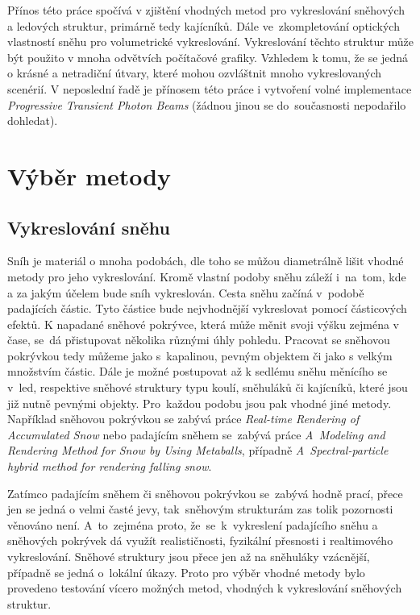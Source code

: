 Přínos této práce spočívá v zjištění vhodných metod pro vykreslování sněhových a ledových struktur, primárně tedy kajícníků. Dále ve~zkompletování optických vlastností sněhu pro volumetrické vykreslování. Vykreslování těchto struktur může být použito v mnoha odvětvích počítačové grafiky. Vzhledem k tomu, že se jedná o krásné a netradiční útvary, které mohou ozvláštnit mnoho vykreslovaných scenérií. V neposlední řadě je přínosem této práce i vytvoření volné implementace \textit{Progressive Transient Photon Beams} (žádnou jinou se do~současnosti nepodařilo dohledat). 

\chapter{Výběr metody}
\section{Vykreslování sněhu}
Sníh je materiál o mnoha podobách, dle toho se můžou diametrálně lišit vhodné metody pro jeho vykreslování. Kromě vlastní podoby sněhu záleží i~na~tom, kde a za jakým účelem bude sníh vykreslován. Cesta sněhu začíná v~podobě padajících částic. Tyto částice bude nejvhodnější vykreslovat pomocí částicových efektů. K napadané sněhové pokrývce, která může měnit svoji výšku zejména v čase, se~dá přistupovat několika různými úhly pohledu. Pracovat se sněhovou pokrývkou tedy můžeme jako s~kapalinou, pevným objektem či jako s velkým množstvím částic. Dále je možné postupovat až k sedlému sněhu měnícího se v~led, respektive sněhové struktury typu koulí, sněhuláků či kajícníků, které jsou již nutně pevnými objekty. Pro~každou podobu jsou pak vhodné jiné metody. Například sněhovou pokrývkou se zabývá práce \textit{Real-time Rendering of Accumulated Snow}\cite{accumulated-snow} nebo padajícím sněhem se~zabývá práce \textit{A~Modeling and Rendering Method for Snow by Using Metaballs}\cite{falling-snow2}, případně \textit{A~Spectral-particle hybrid method for rendering falling snow}\cite{falling-snow}.

Zatímco padajícím sněhem či sněhovou pokrývkou se~zabývá hodně prací, přece jen se jedná o velmi časté jevy, tak~sněhovým strukturám zas tolik pozornosti věnováno není. A~to~zejména proto, že~se~k~vykreslení padajícího sněhu a sněhových pokrývek dá využít realističnosti, fyzikální přesnosti i realtimového vykreslování. Sněhové struktury jsou přece jen až na sněhuláky vzácnější, případně se jedná o~lokální úkazy. Proto pro výběr vhodné metody bylo provedeno testování vícero možných metod, vhodných k vykreslování sněhových struktur.

